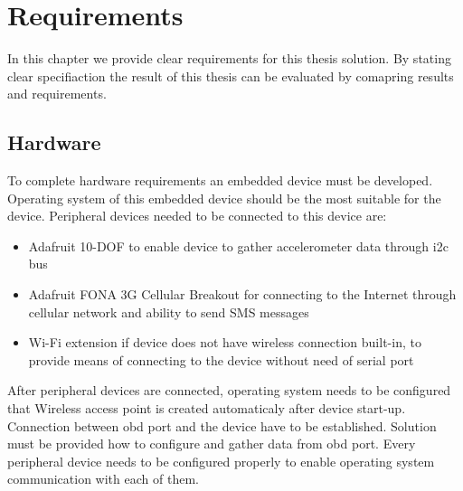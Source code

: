 \section{Requirements}
In this chapter  we provide clear requirements for this thesis solution. By stating clear specifiaction the result of this thesis can be evaluated by comapring results and requirements.
\subsection{Hardware}
To complete hardware requirements an embedded device must be developed. Operating system of this embedded device should be the most suitable for the device.
Peripheral devices needed to be connected to this device are:
\begin{itemize}
	\item Adafruit 10-DOF to enable device to gather accelerometer data through \gls{i2c} bus
	\item Adafruit FONA 3G Cellular Breakout for connecting to the Internet through cellular network and ability to send SMS messages
	\item Wi-Fi extension if device does not have wireless connection built-in, to provide means of connecting to the device without need of serial port
\end{itemize}
After peripheral devices are connected, operating system needs to be configured that Wireless access point is created automaticaly after device start-up. Connection between \gls{obd} port and the device have to be established. Solution must be provided how to configure and gather data from \gls{obd} port. Every peripheral device needs to be configured properly to enable operating system communication with each of them.
